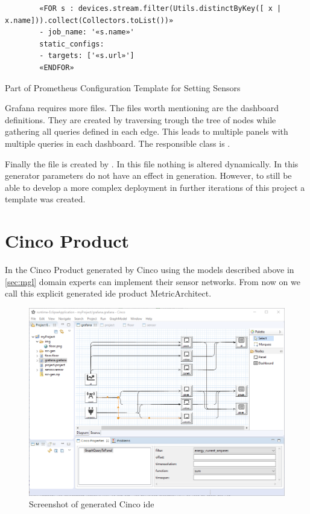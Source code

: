 \begin{listing}
	\begin{verbatim}
		«FOR s : devices.stream.filter(Utils.distinctByKey([ x | x.name])).collect(Collectors.toList())»
		- job_name: '«s.name»'
		static_configs:
		- targets: ['«s.url»']
		«ENDFOR»
	\end{verbatim}
	\caption{Part of Prometheus Configuration Template for Setting Sensors}
	\label{lst:xtend_prom}
\end{listing} 

Grafana requires more files. The files worth mentioning are the dashboard definitions. They are created by traversing trough the tree of nodes while gathering all queries defined in each  edge. This leads to multiple panels with multiple queries in each dashboard. The responsible class is .

Finally the  file is created by . In this file nothing is altered dynamically. In this generator parameters do not have an effect in generation. However, to still be able to develop a more complex deployment in further iterations of this project a template was created.

\section{Cinco Product}

In the Cinco Product generated by Cinco using the models described above in \cref{sec:mgl} domain experts can implement their sensor networks. From now on we call this explicit generated \gls{ide} product MetricArchitect. 

\begin{figure}
	\includegraphics[width=\textwidth]{assets/images/editor}
	\caption{Screenshot of generated Cinco \gls{ide}}
	\label{fig:editor}
\end{figure}


